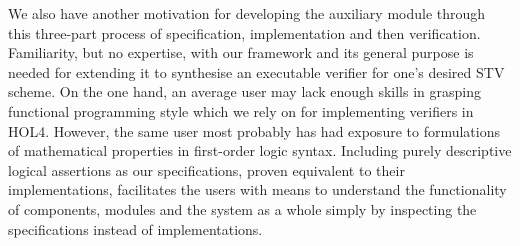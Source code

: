 \documentclass[10pt,conference]{IEEEtran}
\begin{document}
We also have another motivation for developing the auxiliary module through this three-part process of specification, implementation and then verification. Familiarity, but no expertise, with our framework and its general purpose is needed for extending it to synthesise an executable verifier for one's desired STV scheme. On the one hand, an average user may lack enough skills in grasping functional programming style which we rely on for implementing verifiers in HOL4. However, the same user most probably has had exposure to formulations of mathematical properties  in first-order logic syntax. Including purely descriptive logical assertions as our specifications, proven equivalent to their implementations, facilitates the users with means to understand the functionality of components, modules and the system as a whole simply by inspecting the specifications instead of implementations.
\end{document}
